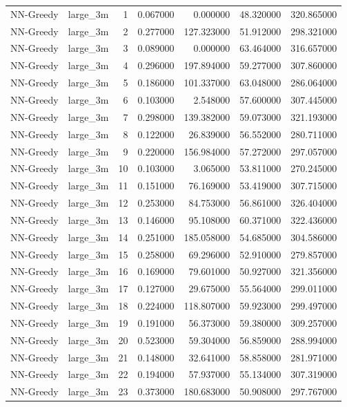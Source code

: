 \begin{tabular}{llrrrrr}
NN-Greedy & large_3m & 1 & 0.067000 & 0.000000 & 48.320000 & 320.865000 \\
NN-Greedy & large_3m & 2 & 0.277000 & 127.323000 & 51.912000 & 298.321000 \\
NN-Greedy & large_3m & 3 & 0.089000 & 0.000000 & 63.464000 & 316.657000 \\
NN-Greedy & large_3m & 4 & 0.296000 & 197.894000 & 59.277000 & 307.860000 \\
NN-Greedy & large_3m & 5 & 0.186000 & 101.337000 & 63.048000 & 286.064000 \\
NN-Greedy & large_3m & 6 & 0.103000 & 2.548000 & 57.600000 & 307.445000 \\
NN-Greedy & large_3m & 7 & 0.298000 & 139.382000 & 59.073000 & 321.193000 \\
NN-Greedy & large_3m & 8 & 0.122000 & 26.839000 & 56.552000 & 280.711000 \\
NN-Greedy & large_3m & 9 & 0.220000 & 156.984000 & 57.272000 & 297.057000 \\
NN-Greedy & large_3m & 10 & 0.103000 & 3.065000 & 53.811000 & 270.245000 \\
NN-Greedy & large_3m & 11 & 0.151000 & 76.169000 & 53.419000 & 307.715000 \\
NN-Greedy & large_3m & 12 & 0.253000 & 84.753000 & 56.861000 & 326.404000 \\
NN-Greedy & large_3m & 13 & 0.146000 & 95.108000 & 60.371000 & 322.436000 \\
NN-Greedy & large_3m & 14 & 0.251000 & 185.058000 & 54.685000 & 304.586000 \\
NN-Greedy & large_3m & 15 & 0.258000 & 69.296000 & 52.910000 & 279.857000 \\
NN-Greedy & large_3m & 16 & 0.169000 & 79.601000 & 50.927000 & 321.356000 \\
NN-Greedy & large_3m & 17 & 0.127000 & 29.675000 & 55.564000 & 299.011000 \\
NN-Greedy & large_3m & 18 & 0.224000 & 118.807000 & 59.923000 & 299.497000 \\
NN-Greedy & large_3m & 19 & 0.191000 & 56.373000 & 59.380000 & 309.257000 \\
NN-Greedy & large_3m & 20 & 0.523000 & 59.304000 & 56.859000 & 288.994000 \\
NN-Greedy & large_3m & 21 & 0.148000 & 32.641000 & 58.858000 & 281.971000 \\
NN-Greedy & large_3m & 22 & 0.194000 & 57.937000 & 55.134000 & 307.319000 \\
NN-Greedy & large_3m & 23 & 0.373000 & 180.683000 & 50.908000 & 297.767000 \\

\end{tabular}
